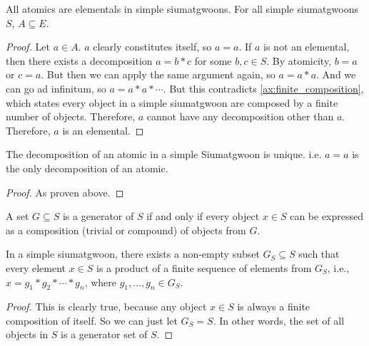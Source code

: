 \begin{lemma}\label{def:atomics-are-elementals-in-simple-siumatgwoons}
    All atomics are elementals in simple siumatgwoons. For all simple siumatgwoons $S$, $A \subseteq E$.
\end{lemma}
\begin{proof}
    Let $a \in A$. $a$ clearly constitutes itself, so $a=a$. If $a$ is not an elemental, then there exists a decomposition $a=b*c$ for some $b,c \in S$. By atomicity, $b=a$ or $c=a$. But then we can apply the same argument again, so $a=a*a$. And we can go ad infinitum, so $a=a*a*\cdots$. But this contradicts \ref{ax:finite_composition}, which states every object in a simple siumatgwoon are composed by a finite number of objects. Therefore, $a$ cannot have any decomposition other than $a$. Therefore, $a$ is an elemental.
\end{proof}


\begin{lemma}[Atomics]\label{def:atomics}
    The decomposition of an atomic in a simple Siumatgwoon is unique. i.e. $a=a$ is the only decomposition of an atomic.
\end{lemma}
\begin{proof}
    As proven above.
\end{proof}



\begin{definition}[Generators]\label{def:generators}
    A set $G \subseteq S$ is a generator of $S$ if and only if every object $x \in S$ can be expressed as a composition (trivial or compound) of objects from $G$.
\end{definition}

\begin{theorem}\label{thm:generator-sets-exist-in-simple-siumatgwoons}
    In a simple siumatgwoon, there exists a non-empty subset $G_{S} \subseteq S$ such that every element $x \in S$ is a product of a finite sequence of elements from $G_S$, i.e., $x = g_1 * g_2 * \cdots * g_n$, where $g_1, \dots, g_n \in G_S$.
\end{theorem}

\begin{proof}
    This is clearly true, because any object $x\in S$ is always a finite composition of itself. So we can just let $G_S = S$. In other words, the set of all objects in $S$ is a generator set of $S$.
\end{proof}


